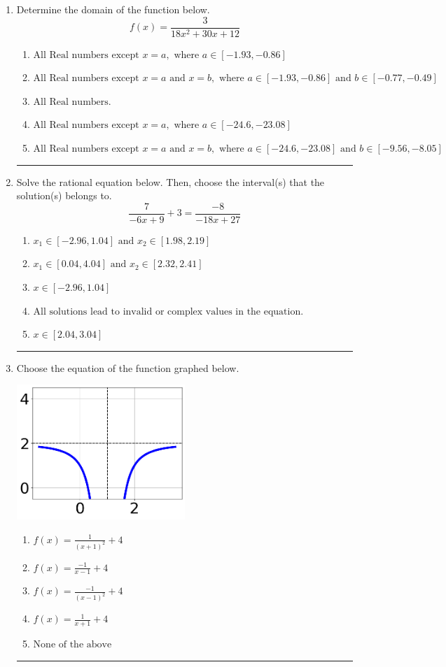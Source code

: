 \documentclass[14pt]{extbook}
\newcommand{\litem}[1]{\item#1\hspace*{-1cm}\rule{\textwidth}{0.4pt}}
\begin{document}
\begin{enumerate}
{\begin{enumerate}[label=\Alph*.]
\end{enumerate} }
\litem{
Determine the domain of the function below.\[ f(x) = \frac{3}{18x^{2} +30 x + 12} \]\begin{enumerate}[label=\Alph*.]
\item \( \text{All Real numbers except } x = a, \text{ where } a \in [-1.93, -0.86] \)
\item \( \text{All Real numbers except } x = a \text{ and } x = b, \text{ where } a \in [-1.93, -0.86] \text{ and } b \in [-0.77, -0.49] \)
\item \( \text{All Real numbers.} \)
\item \( \text{All Real numbers except } x = a, \text{ where } a \in [-24.6, -23.08] \)
\item \( \text{All Real numbers except } x = a \text{ and } x = b, \text{ where } a \in [-24.6, -23.08] \text{ and } b \in [-9.56, -8.05] \)

\end{enumerate} }
\litem{
Solve the rational equation below. Then, choose the interval(s) that the solution(s) belongs to.\[ \frac{7}{-6x + 9} + 3 = \frac{-8}{-18x + 27} \]\begin{enumerate}[label=\Alph*.]
\item \( x_1 \in [-2.96, 1.04] \text{ and } x_2 \in [1.98,2.19] \)
\item \( x_1 \in [0.04, 4.04] \text{ and } x_2 \in [2.32,2.41] \)
\item \( x \in [-2.96,1.04] \)
\item \( \text{All solutions lead to invalid or complex values in the equation.} \)
\item \( x \in [2.04,3.04] \)

\end{enumerate} }
\litem{
Choose the equation of the function graphed below.
\begin{center}
    \includegraphics[width=0.5\textwidth]{../Figures/rationalGraphToEquationC.png}
\end{center}
\begin{enumerate}[label=\Alph*.]
\item \( f(x) = \frac{1}{(x + 1)^2} + 4 \)
\item \( f(x) = \frac{-1}{x - 1} + 4 \)
\item \( f(x) = \frac{-1}{(x - 1)^2} + 4 \)
\item \( f(x) = \frac{1}{x + 1} + 4 \)
\item \( \text{None of the above} \)


\end{enumerate}}
\end{enumerate}
\end{document}
